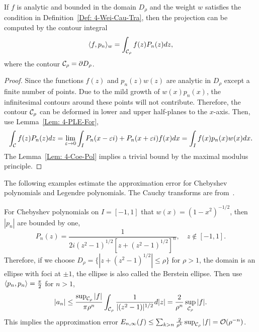 \begin{lemma}
\label{Lem: 4-Coe-Pol}
    If $f$ is analytic and bounded in the domain $D_{\rho}$ and the weight $w$ satisfies the condition in Definition~\ref{Def: 4-Wei-Cau-Tra}, 
    then the projection can be computed by the contour integral
    \begin{equation}
        \langle {f, p_n} \rangle_w = \int_{\mathcal C_{\rho}} f(z) P_n(z) dz,
    \end{equation}
    where the contour $\mathcal C_{\rho} = \partial D_{\rho}$.
\end{lemma}
\begin{proof}
    Since the functions $f(z)$ and $p_n(z) w(z)$ are analytic in $D_{\rho}$ except a finite number of points. Due to the mild growth of $w(x)p_n(x)$, the infinitesimal contours around these points will not contribute. Therefore, the contour $\mathcal C_{\rho}$ can be deformed in lower and upper half-planes to the $x$-axis. Then, use Lemma~\ref{Lem: 4-PLE-For}, 
    \begin{equation}
         \int_{\mathcal C} f(z) P_n(z) dz = \lim_{\varepsilon\to 0} \int_{I}  P_n(x - \varepsilon i) + P_n(x + \varepsilon i) f(x) dx = \int_{I} f(x) p_n(x) w(x) dx. 
    \end{equation}
    The Lemma~\ref{Lem: 4-Coe-Pol} implies a trivial bound by the maximal modulus principle.
\end{proof}
The following examples estimate the approximation error for Chebyshev polynomials and Legendre polynomials. The Cauchy transforms are from~\cite{elliott1974asymptotic}.
\begin{example}
    For Chebyshev polynomials on $I = [-1,1]$ that $w(x) = (1 - x^2)^{-1/2}$, then $|p_n|$ are bounded by one,  
    \begin{equation}
        P_n(z) = \frac{1}{2i (z^2 - 1)^{1/2} [z + (z^2 - 1)^{1/2}]^n},\quad z \notin [-1, 1].
    \end{equation}
    Therefore, if we choose $D_{\rho} = \{|z + (z^2 - 1)^{1/2}| \le \rho\}$ for $\rho > 1$, the domain is an ellipse with foci at $\pm 1$, the ellipse is also called the Berstein ellipse. Then use $\langle {p_n, p_n} \rangle = \frac{\pi}{2}$ for $n > 1$, 
    \begin{equation}
        |a_n| \le \frac{\sup_{\mathcal C_{\rho}} |f|}{\pi \rho^n } \int_{\mathcal C_{\rho}} \frac{1}{|(z^2 - 1)|^{1/2}} d|z| = \frac{2}{\rho^n} \sup_{\mathcal C_{\rho}} |f|.
    \end{equation}
    This implies the approximation error $E_{n,\infty}(f) \le \sum_{k > n} \frac{2}{\rho^k} \sup_{\mathcal C_{\rho}} |f| = \mathcal O(\rho^{-n})$.
\end{example}
